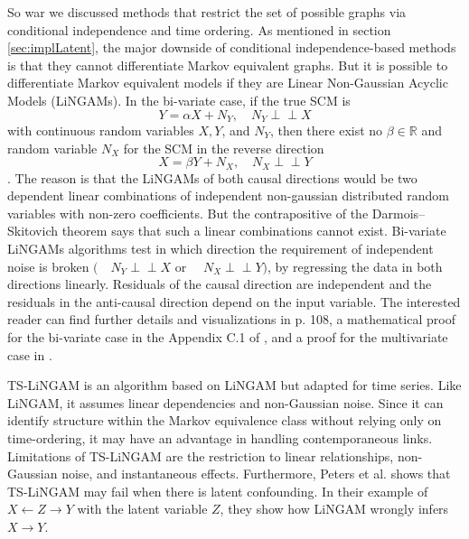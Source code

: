 \documentclass[conference]{IEEEtran}
\begin{document}
So war we discussed methods that restrict the set of possible graphs via conditional independence and time ordering. As mentioned in section \ref{sec:implLatent}, the major downside of conditional independence-based methods is that they cannot differentiate Markov equivalent graphs. 
But it is possible to differentiate Markov equivalent models if they are Linear Non-Gaussian Acyclic Models (LiNGAMs).
In the bi-variate case, if the true SCM is 
\begin{equation}
Y=\alpha X+N_{Y}, \quad N_{Y} \!\perp\!\!\!\perp X
\end{equation}
with continuous random variables $X, Y$, and $N_Y$, then there exist no $\beta\in\mathbb{R}$ and random variable $N_X$ for the SCM in the reverse direction
\begin{equation}
X=\beta Y+N_{X}, \quad N_{X} \!\perp\!\!\!\perp Y
\end{equation}\cite{peters_elements_2018}.
The reason is that the LiNGAMs of both causal directions would be two dependent linear combinations of independent non-gaussian distributed random variables with non-zero coefficients. But the contrapositive of the Darmois–Skitovich theorem\cite{skitovich_linear_1954} says that such a linear combinations cannot exist.
Bi-variate LiNGAMs algorithms test in which direction the requirement of independent noise is broken $(\quad N_{Y} \!\perp\!\!\!\perp X$ or $\quad N_{X} \!\perp\!\!\!\perp Y)$, by regressing the data in both directions linearly. Residuals of the causal direction are independent and the residuals in the anti-causal direction depend on the input variable. 
The interested reader can find further details and visualizations in \cite{neal_introduction_2020} p. 108, a mathematical proof for the bi-variate case in the Appendix C.1 of \cite{peters_elements_2018}, and a proof for the multivariate case in \cite{shimizu_linear_2006}.

TS-LiNGAM is an algorithm based on LiNGAM but adapted for time series\cite{hyvarinen_causal_2008}. Like LiNGAM, it assumes linear dependencies and non-Gaussian noise. Since it can identify structure within the Markov equivalence class without relying only on time-ordering, it may have an advantage in handling contemporaneous links.
Limitations of TS-LiNGAM are the restriction to linear relationships, non-Gaussian noise, and instantaneous effects\cite{peters_causal_2013}. Furthermore, Peters et al. shows that TS-LiNGAM may fail when there is latent confounding. In their example of $X\leftarrow Z \rightarrow Y$ with the latent variable $Z$, they show how LiNGAM wrongly infers $X\rightarrow Y$\cite{peters_causal_2013}.
\end{document}
